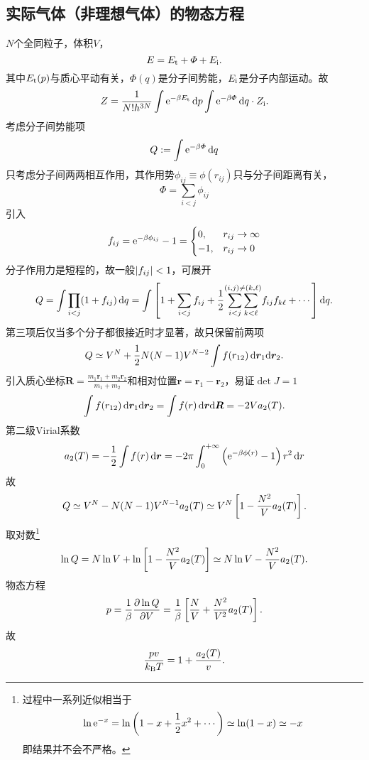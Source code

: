 \subsection[实际气体的物态方程]{实际气体（非理想气体）的物态方程}
$N$个全同粒子，体积$V$，
\[
	E=E_\mathrm t+\varPhi+E_{\mathrm{i}}.
\]
其中$E_\mathrm t(p)$与质心平动有关，$\varPhi(q)$是分子间势能，$E_{\mathrm{i}}$是分子内部运动。故
\[
	Z=\frac1{N!h^{3N}}\int\mathop{}\!\mathrm{e}^{-\beta E_\mathrm t}\mathop{}\!\mathrm{d} p\int\mathop{}\!\mathrm{e}^{-\beta\varPhi}\mathop{}\!\mathrm{d} q\cdot Z_{\mathrm{i}}.
\]
考虑分子间势能项
\[
	Q:=\int\mathop{}\!\mathrm{e}^{-\beta\varPhi}\mathop{}\!\mathrm{d} q
\]
只考虑分子间两两相互作用，其作用势$\phi_{ij}\equiv\phi(r_{ij})$只与分子间距离有关，
\[
	\varPhi=\sum_{i<j}\phi_{ij}
\]
引入
\[
	f_{ij}=\mathop{}\!\mathrm{e}^{-\beta\phi_{ij}}-1=
	\begin{cases}
		0,&r_{ij}\to\infty\\
		-1,&r_{ij}\to0
	\end{cases}
\]
分子作用力是短程的，故一般$\left\lvert f_{ij}\right\rvert<1$，可展开
\[
	Q=\int\prod_{i<j}(1+f_{ij})\mathop{}\!\mathrm{d} q=\int\left[1+\sum_{i<j}f_{ij}+\frac12\overset{(i,j)\neq(k,\ell)}{\sum_{i<j}\sum_{k<\ell}}f_{ij}f_{k\ell}+\cdots\right]\mathop{}\!\mathrm{d} q.
\]
第三项后仅当多个分子都很接近时才显著，故只保留前两项
\[
	Q\simeq V^N+\frac12N(N-1)V^{N-2}\int f(r_{12})\mathop{}\!\mathrm{d}\bm r_1\mathrm{d}\bm r_2.
\]
引入质心坐标$\bm R=\frac{m_1\bm r_1+m_2\bm r_2}{m_1+m_2}$和相对位置$\bm r=\bm r_1-\bm r_2$，易证$\det J=1$
\[
	\int f(r_{12})\mathop{}\!\mathrm{d}\bm r_1\mathrm{d}\bm r_2=\int f(r)\mathop{}\!\mathrm{d}\bm r\mathrm{d}\bm R=-2Va_2(T).
\]
第二级Virial系数
\begin{align}
	a_2(T)=-\frac12\int f(r)\mathop{}\!\mathrm{d}\bm r=-2\pi\int_0^{+\infty}\left(\mathop{}\!\mathrm{e}^{-\beta\phi(r)}-1\right)r^2\mathop{}\!\mathrm{d} r
\end{align}
故
\[
	Q\simeq V^N-N(N-1)V^{N-1}a_2(T)\simeq V^N\left[1-\frac{N^2}Va_2(T)\right].
\]
取对数\footnote{过程中一系列近似相当于
\[
	\ln\mathop{}\!\mathrm{e}^{-x}=\ln\left(1-x+\frac12x^2+\cdots\right)\simeq\ln(1-x)\simeq -x
\]
即结果并不会不严格。}
\begin{align}
	\ln Q=N\ln V+\ln\left[1-\frac{N^2}Va_2(T)\right]\simeq N\ln V-\frac{N^2}Va_2(T).
\end{align}
物态方程
\begin{align*}
	p=\frac1\beta\frac{\partial^{\;\!\!}\ln Q}{\partial V^{\;\!\!}}=\frac1\beta\left[\frac NV+\frac{N^2}{V^2}a_2(T)\right].
\end{align*}
故
\begin{align}
	\frac{pv}{k_{\mathrm B} T}=1+\frac{a_2(T)}v.
\end{align}
